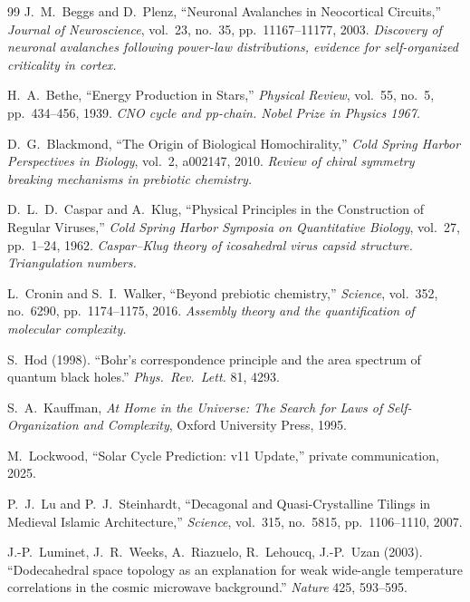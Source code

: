 \vspace{2em}
\begin{thebibliography}{99}
J.~M.~Beggs and D.~Plenz,
``Neuronal Avalanches in Neocortical Circuits,''
\emph{Journal of Neuroscience}, vol.~23, no.~35, pp.~11167--11177, 2003.
\textit{Discovery of neuronal avalanches following power-law distributions, evidence for self-organized criticality in cortex.}

H.~A.~Bethe,
``Energy Production in Stars,''
\emph{Physical Review}, vol.~55, no.~5, pp.~434--456, 1939.
\textit{CNO cycle and pp-chain. Nobel Prize in Physics 1967.}

D.~G.~Blackmond,
``The Origin of Biological Homochirality,''
\emph{Cold Spring Harbor Perspectives in Biology}, vol.~2, a002147, 2010.
\textit{Review of chiral symmetry breaking mechanisms in prebiotic chemistry.}

D.~L.~D.~Caspar and A.~Klug,
``Physical Principles in the Construction of Regular Viruses,''
\emph{Cold Spring Harbor Symposia on Quantitative Biology}, vol.~27, pp.~1--24, 1962.
\textit{Caspar--Klug theory of icosahedral virus capsid structure. Triangulation numbers.}

L.~Cronin and S.~I.~Walker,
``Beyond prebiotic chemistry,''
\emph{Science}, vol.~352, no.~6290, pp.~1174--1175, 2016.
\textit{Assembly theory and the quantification of molecular complexity.}

S.~Hod (1998).
``Bohr's correspondence principle and the area spectrum of quantum black holes.''
\textit{Phys.\ Rev.\ Lett.} 81, 4293.

S.~A.~Kauffman,
\emph{At Home in the Universe: The Search for Laws of Self-Organization and Complexity},
Oxford University Press, 1995.

M.~Lockwood, ``Solar Cycle Prediction: v11 Update,'' private communication, 2025.

P.~J.~Lu and P.~J.~Steinhardt,
``Decagonal and Quasi-Crystalline Tilings in Medieval Islamic Architecture,''
\emph{Science}, vol.~315, no.~5815, pp.~1106--1110, 2007.

J.-P.~Luminet, J.~R.~Weeks, A.~Riazuelo, R.~Lehoucq, J.-P.~Uzan (2003).
``Dodecahedral space topology as an explanation for weak wide-angle temperature correlations in the cosmic microwave background.''
\textit{Nature} 425, 593--595.


\end{thebibliography}
